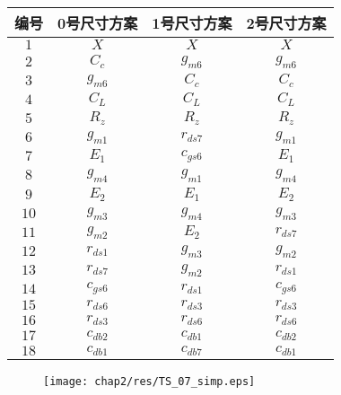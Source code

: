\begin{table}[!htbp]
	\centering
	\begin{tabular}{c|c|c|c}
		\hline
		 编号  &  0号尺寸方案   &  1号尺寸方案   &  2号尺寸方案   \\ \hline
		$1$  &    $X$    &    $X$    &    $X$    \\
		$2$  &  $C_{c}$  & $g_{m6}$  & $g_{m6}$  \\
		$3$  & $g_{m6}$  &  $C_{c}$  &  $C_{c}$  \\
		$4$  &  $C_{L}$  &  $C_{L}$  &  $C_{L}$  \\
		$5$  &  $R_{z}$  &  $R_{z}$  &  $R_{z}$  \\
		$6$  & $g_{m1}$  & $r_{ds7}$ & $g_{m1}$  \\
		$7$  &  $E_{1}$  & $c_{gs6}$ &  $E_{1}$  \\
		$8$  & $g_{m4}$  & $g_{m1}$  & $g_{m4}$  \\
		$9$  &  $E_{2}$  &  $E_{1}$  &  $E_{2}$  \\
		$10$ & $g_{m3}$  & $g_{m4}$  & $g_{m3}$  \\
		$11$ & $g_{m2}$  &  $E_{2}$  & $r_{ds7}$ \\
		$12$ & $r_{ds1}$ & $g_{m3}$  & $g_{m2}$  \\
		$13$ & $r_{ds7}$ & $g_{m2}$  & $r_{ds1}$ \\
		$14$ & $c_{gs6}$ & $r_{ds1}$ & $c_{gs6}$ \\
		$15$ & $r_{ds6}$ & $r_{ds3}$ & $r_{ds3}$ \\
		$16$ & $r_{ds3}$ & $r_{ds6}$ & $r_{ds6}$ \\
		$17$ & $c_{db2}$ & $c_{db1}$ & $c_{db2}$ \\
		$18$ & $c_{db1}$ & $c_{db7}$ & $c_{db1}$ \\ \hline
	\end{tabular}
\end{table}

\begin{figure}[!htp]
	\centering
	\texttt{[image: chap2/res/TS\_07\_simp.eps]}
\end{figure}

